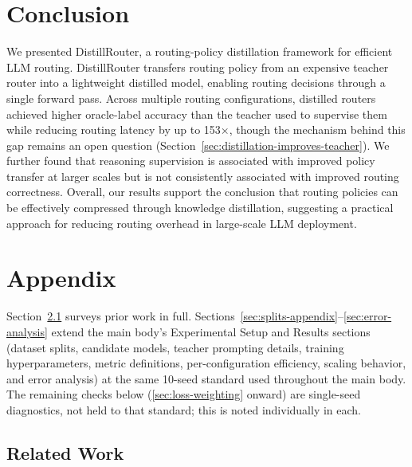 \documentclass{article}
\begin{document}
\section{Conclusion}
\label{sec:conclusion}

We presented DistillRouter, a routing-policy distillation framework for efficient LLM routing. DistillRouter transfers routing policy from an expensive teacher router into a lightweight distilled model, enabling routing decisions through a single forward pass. Across multiple routing configurations, distilled routers achieved higher oracle-label accuracy than the teacher used to supervise them while reducing routing latency by up to 153×, though the mechanism behind this gap remains an open question (Section~\ref{sec:distillation-improves-teacher}). We further found that reasoning supervision is associated with improved policy transfer at larger scales but is not consistently associated with improved routing correctness. Overall, our results support the conclusion that routing policies can be effectively compressed through knowledge distillation, suggesting a practical approach for reducing routing overhead in large-scale LLM deployment.






\appendix
\section{Appendix}
\label{sec:appendix}

Section~\ref{sec:related-work} surveys prior work in full. Sections~\ref{sec:splits-appendix}--\ref{sec:error-analysis}
extend the main body's Experimental Setup and Results sections
(dataset splits, candidate models, teacher prompting details, training
hyperparameters, metric definitions, per-configuration efficiency,
scaling behavior, and error analysis) at the same 10-seed standard
used throughout the main body. The remaining checks below
(\ref{sec:loss-weighting} onward) are single-seed diagnostics, not
held to that standard; this is noted individually in each.

\subsection{Related Work}
\label{sec:related-work}
\end{document}

